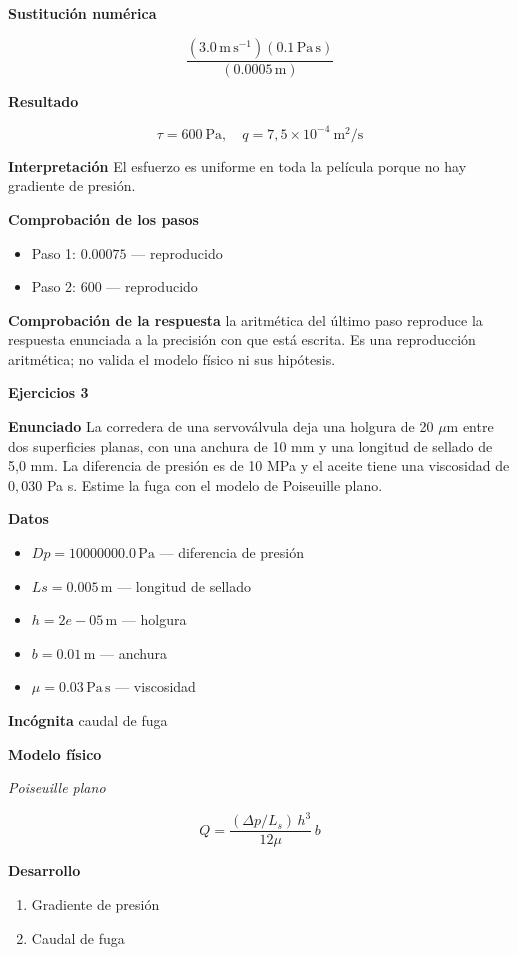 \documentclass[10pt,openany]{book}
\begin{document}
\noindent\textbf{Sustitución numérica}

\[
\frac{\left(3.0\,\mathrm{m}\,\mathrm{s}^{-1}\right) \left(0.1\,\mathrm{Pa}\,\mathrm{s}\right)}{\left(0.0005\,\mathrm{m}\right)}
\]

\noindent\textbf{Resultado}

\[
\tau = 600\ \mathrm{Pa},\quad q = 7{,}5\times 10^{-4}\ \mathrm{m^{2}/s}
\]

\noindent\textbf{Interpretación}
El esfuerzo es uniforme en toda la película porque no hay gradiente de presión.

\noindent\textbf{Comprobación de los pasos}
\begin{itemize}
\item Paso 1: $0.00075$ — reproducido
\item Paso 2: $600$ — reproducido
\end{itemize}

\noindent\textbf{Comprobación de la respuesta} la aritmética del último paso reproduce la respuesta enunciada a la precisión con que está escrita. Es una reproducción aritmética; no valida el modelo físico ni sus hipótesis.

\noindent\textbf{Ejercicios 3}

\noindent\textbf{Enunciado}
La corredera de una servoválvula deja una holgura de 20 \(\mu\)m entre dos superficies planas, con una anchura de 10 mm y una longitud de sellado de 5,0 mm. La diferencia de presión es de 10 MPa y el aceite tiene una viscosidad de \(0{,}030\) Pa s. Estime la fuga con el modelo de Poiseuille plano.

\noindent\textbf{Datos}
\begin{itemize}
\item $Dp = 10000000.0\,\mathrm{Pa}$ — diferencia de presión
\item $Ls = 0.005\,\mathrm{m}$ — longitud de sellado
\item $h = 2e-05\,\mathrm{m}$ — holgura
\item $b = 0.01\,\mathrm{m}$ — anchura
\item $\mu = 0.03\,\mathrm{Pa}\,\mathrm{s}$ — viscosidad
\end{itemize}

\noindent\textbf{Incógnita}
caudal de fuga

\noindent\textbf{Modelo físico}

\noindent\textit{Poiseuille plano}

\[
Q = \frac{(\Delta p/L_s)\,h^{3}}{12\mu}\,b
\]

\noindent\textbf{Desarrollo}
\begin{enumerate}
\item
Gradiente de presión
\item
Caudal de fuga
\end{enumerate}
\end{document}
